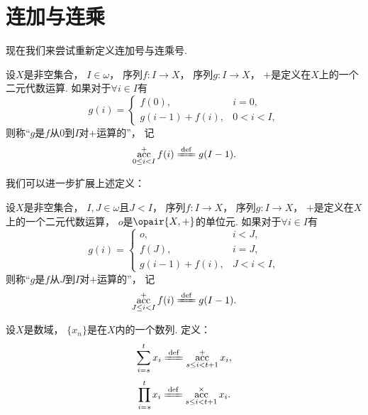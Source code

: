 \section{连加与连乘}
现在我们来尝试重新定义连加号与连乘号.

\begin{definition}
设\(X\)是非空集合，
\(I\in\omega\)，
序列\(f\colon I \to X\)，
序列\(g\colon I \to X\)，
\(+\)是定义在\(X\)上的一个二元代数运算.
如果对于\(\forall i\in I\)有\[
	g(i) = \left\{ \begin{array}{lc}
		f(0), & i=0, \\
		g(i-1) + f(i), & 0<i<I,
	\end{array} \right.
\]
则称“\(g\)是\(f\)从\(0\)到\(I\)对\(+\)运算的”，
记\[
	\Accumulate_{0 \leq i < I}^+ f(i)
	\defeq
	g(I-1).
\]
\end{definition}

我们可以进一步扩展上述定义：
\begin{definition}
设\(X\)是非空集合，
\(I,J\in\omega\)且\(J<I\)，
序列\(f\colon I \to X\)，
序列\(g\colon I \to X\)，
\(+\)是定义在\(X\)上的一个二元代数运算，
\(o\)是\(\opair{X,+}\)的单位元.
如果对于\(\forall i\in I\)有\[
	g(i) = \left\{ \begin{array}{lc}
		o, & i<J, \\
		f(J), & i=J, \\
		g(i-1) + f(i), & J<i<I,
	\end{array} \right.
\]
则称“\(g\)是\(f\)从\(J\)到\(I\)对\(+\)运算的”，
记\[
	\Accumulate_{J \leq i < I}^+ f(i)
	\defeq
	g(I-1).
\]
\end{definition}

\begin{definition}
设\(X\)是数域，
\(\{x_n\}\)是在\(X\)内的一个数列.
定义：\[
	\sum_{i=s}^t x_i
	\defeq
	\Accumulate_{s \leq i < t+1}^+ x_i,
\]\[
	\prod_{i=s}^t x_i
	\defeq
	\Accumulate_{s \leq i < t+1}^\times x_i.
\]
\end{definition}
